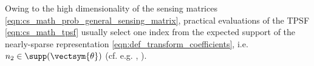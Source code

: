 Owing to
the high dimensionality of
the sensing matrices
\eqref{eqn:cs_math_prob_general_sensing_matrix},
practical evaluations of
the \ac{TPSF}
\eqref{eqn:cs_math_tpsf} usually select
one index from
the expected support of
the nearly-sparse representation
\eqref{eqn:def_transform_coefficients}, i.e.
$n_{2} \in \supp( \vectsym{\theta} )$
(cf. e.g.
\cite[Fig. 1]{article:ProvostITMI2009},
\cite[Figs. 4 and 5]{article:LustigMRM2007}%
).

